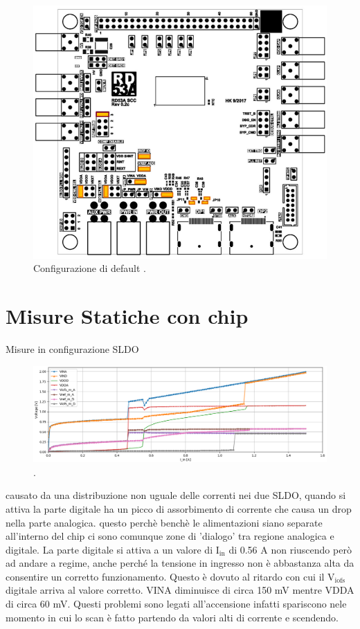 \begin{figure}
\centering
\includegraphics[scale=.3]{Immagini/DirectPowering}
\caption{Configurazione di default .}
\label{DirectPowering}
\end{figure}

\section{Misure Statiche con chip}
Misure in configurazione SLDO
\begin{figure}
\centering
\includegraphics[scale=.3]{Immagini/IUI2}
\caption{.}
\label{IUI}
\end{figure}
causato da una distribuzione non uguale delle correnti nei due SLDO, quando si attiva la parte digitale ha un picco di assorbimento di corrente che causa un drop nella parte analogica. questo perchè benchè le alimentazioni siano separate all'interno del chip ci sono comunque zone di 'dialogo' tra regione analogica e digitale. 
La parte digitale si attiva a un valore di $\mathrm{I_{in}}$ di 0.56 A non riuscendo però ad andare a regime, anche perché la tensione in ingresso non è abbastanza alta da consentire un corretto funzionamento. 
Questo è dovuto al ritardo con cui il $\mathrm{V_{iofs}}$ digitale arriva al valore corretto.
VINA diminuisce di circa 150 mV mentre VDDA di circa 60 mV.
Questi problemi sono legati all'accensione infatti spariscono nele momento in cui lo scan è fatto partendo da valori alti di corrente e scendendo.




